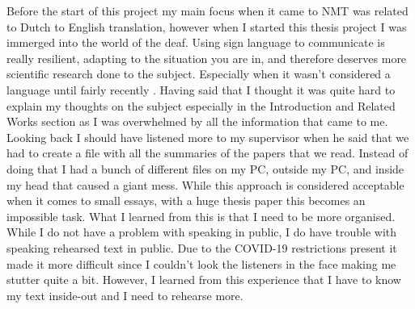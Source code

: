 Before the start of this project my main focus when it came to NMT was related to Dutch to English translation, however when I started this thesis project I was immerged into the world of the deaf. Using sign language to communicate is really resilient, adapting to the situation you are in, and therefore deserves more scientific research done to the subject. Especially when it wasn't considered a language until fairly recently \cite{stokoe2005sign}. Having said that I thought it was quite hard to explain my thoughts on the subject especially in the Introduction and Related Works section as I was overwhelmed by all the information that came to me. Looking back I should have listened more to my supervisor when he said that we had to create a file with all the summaries of the papers that we read. Instead of doing that I had a bunch of different files on my PC, outside my PC, and inside my head that caused a giant mess. While this approach is considered acceptable when it comes to small essays, with a huge thesis paper this becomes an impossible task. What I learned from this is that I need to be more organised.
While I do not have a problem with speaking in public, I do have trouble with speaking rehearsed text in public. Due to the COVID-19 restrictions present it made it more difficult since I couldn't look the listeners in the face making me stutter quite a bit. However, I learned from this experience that I have to know my text inside-out and I need to rehearse more.




